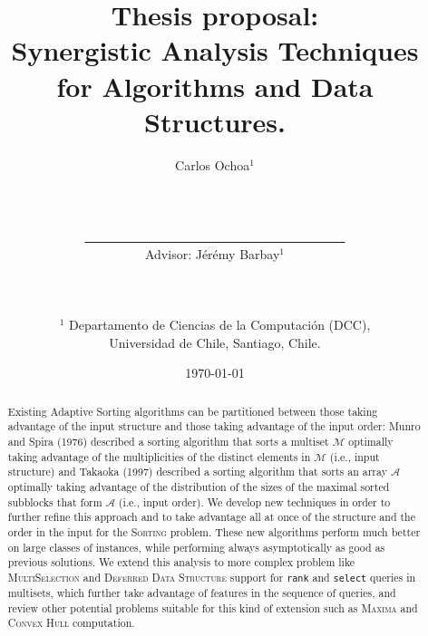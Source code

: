 \documentclass[10pt]{article}
\title{Thesis proposal: \\Synergistic Analysis Techniques\\ for Algorithms and Data Structures.}
\author{Carlos Ochoa$^{1}$
  \\\\\\\\\underline{\ \ \ \ \ \ \ \ \ \ \ \ \ \ \ \ \ \ \ \ \ \ \ \ \
    \ \ \ \ \ \ \ \ \ \ \ \ \ \ \ \ }
  \\Advisor: J\'er\'emy Barbay$^1$\\\\\\\\
  $^1$ Departamento de Ciencias de la Computaci\'on (DCC),\\ Universidad de Chile, Santiago, Chile.
}
\date{\today}
\begin{document}
\maketitle
\begin{abstract}
  Existing Adaptive Sorting algorithms can be partitioned between
  those taking advantage of the input structure and those taking
  advantage of the input order: Munro and Spira (1976) described a
  sorting algorithm that sorts a multiset $\mathcal{M}$ optimally
  taking advantage of the multiplicities of the distinct elements in
  $\mathcal{M}$ (i.e., input structure) and Takaoka (1997) described a
  sorting algorithm that sorts an array $\mathcal{A}$ optimally taking
  advantage of the distribution of the sizes of the maximal sorted
  subblocks that form $\mathcal{A}$ (i.e., input order). We develop
  new techniques in order to further refine this approach and to take
  advantage all at once of the structure and the order in the input
  for the \textsc{Sorting} problem. These new algorithms perform much
  better on large classes of instances, while performing always
  asymptotically as good as previous solutions. We extend this
  analysis to more complex problem like \textsc{MultiSelection} and
  \textsc{Deferred Data Structure} support for \texttt{rank} and
  \texttt{select} queries in multisets, which further take advantage of
  features in the sequence of queries, and review other potential
  problems suitable for this kind of extension such as \textsc{Maxima}
  and \textsc{Convex Hull} computation.
\end{abstract}
\clearpage





\end{document}
